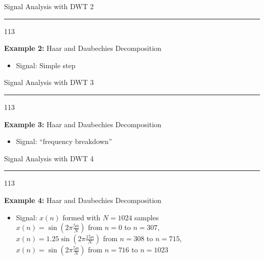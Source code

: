 \documentclass[10pt]{beamer}
\begin{document}
\begin{slide*}
{\large \textsf{Signal Analysis with DWT \hfill{2}}}\\
\hrule
\vspace{10pt}
\begin{dinglist} {113}
\item \textbf{Example 2:} Haar and Daubechies Decomposition
    \begin{itemize} 
    \item Signal: Simple step
    \end{itemize}
\end{dinglist}
\end{slide*}

\begin{slide*}
{\large \textsf{Signal Analysis with DWT \hfill{3}}}\\
\hrule
\vspace{10pt}
\begin{dinglist} {113}
\item \textbf{Example 3:} Haar and Daubechies Decomposition
    \begin{itemize} 
    \item Signal: ``frequency breakdown'' 
    \end{itemize}
\end{dinglist}
\end{slide*}

\begin{slide*}
{\large \textsf{Signal Analysis with DWT \hfill{4}}}\\
\hrule
\vspace{10pt}
\begin{dinglist} {113}
\item \textbf{Example 4:} Haar and Daubechies Decomposition
    \begin{itemize} 
    \item Signal: $x(n)$ formed with $N=1024$ samples \\
    $x(n)=\sin(2\pi\frac{5n}{N})$ from $n=0$ to $n=307$, \\
    $x(n)=1.25\sin(2\pi\frac{15n}{N})$ from $n=308$ to $n=715$, \\
    $x(n)=\sin(2\pi\frac{5n}{N})$ from $n=716$ to $n=1023$ 
    \end{itemize}
\end{dinglist}
\end{slide*}
\end{document}
